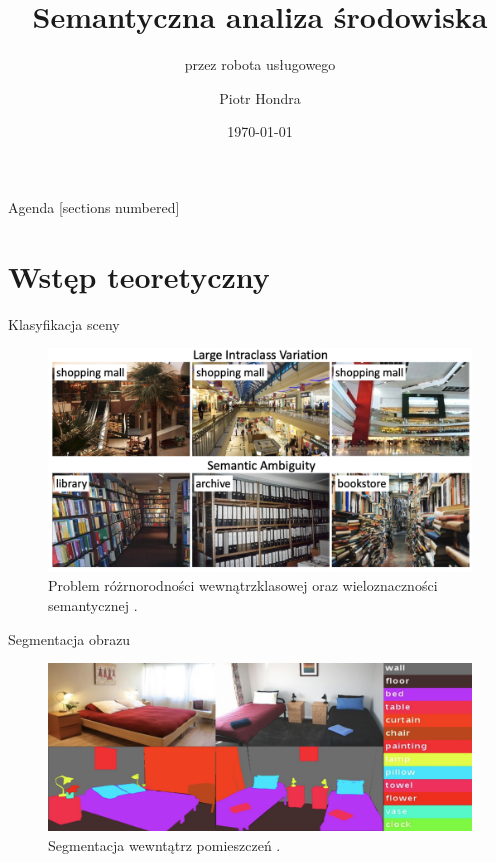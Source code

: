 \documentclass[10pt]{beamer}
\title{Semantyczna analiza środowiska }
\subtitle{przez robota usługowego}
\date{\today}
\date{}
\author{Piotr Hondra}
\institute{Wydział Elektroniki i Technik Informacyjnych, PW}
\begin{document}
\maketitle

\begin{frame}{Agenda}
  [sections numbered]
  \tableofcontents%
\end{frame}
\section[Wstęp teoretyczny]{Wstęp teoretyczny}

\begin{frame}{Klasyfikacja sceny}
  \begin{figure}
    \includegraphics[width=\textwidth]{images/scene_class.png}
    \caption{Problem różrnorodności wewnątrzklasowej oraz wieloznaczności semantycznej \cite{zeng2021deep}.}
  \end{figure}
  
\end{frame}
\begin{frame}{Segmentacja obrazu}
    \begin{figure}
      \includegraphics[width=\textwidth]{images/segment.png}
      \caption{Segmentacja wewntątrz pomieszczeń \cite{zhang2018context}.}
    \end{figure}
    
  \end{frame}
\end{document}
